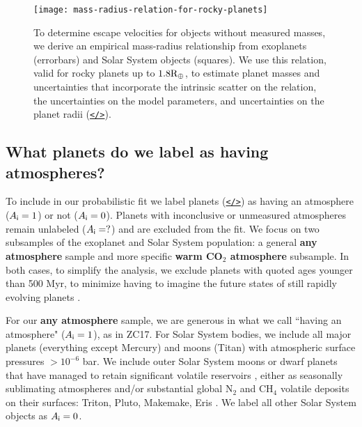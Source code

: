 \documentclass[modern,linenumbers,trackchanges]{aastex7}
\begin{document}
\begin{figure*}[ht!]
\texttt{[image: mass-radius-relation-for-rocky-planets]}
\caption{To determine escape velocities for objects without measured masses, we derive an empirical mass-radius relationship from exoplanets (errorbars) and Solar System objects (squares). We use this relation, valid for rocky planets up to $1.8\rm{R}_\oplus$, to estimate planet masses and uncertainties that incorporate the intrinsic scatter on the relation, the uncertainties on the model parameters, and uncertainties on the planet radii (\href{https://github.com/zkbt/shoreline/blob/main/notebooks/fit-mass-radius-relation.ipynb}{\texttt{</>}}).
}
\label{f:mass-radius}
\end{figure*}

\subsection{What planets do we label as having atmospheres?}

To include in our probabilistic fit we label planets (\href{https://github.com/zkbt/shoreline/blob/main/notebooks/curate-and-label-planets.ipynb}{\texttt{</>}}) as having an atmosphere ($A_{\sf i} = 1$) or not ($A_{\sf i} = 0$). Planets with inconclusive or unmeasured atmospheres remain unlabeled ($A_{\sf i} = ?$) and are excluded from the fit. We focus on two subsamples of the exoplanet and Solar System population: a general \textbf{any atmosphere} sample and more specific \textbf{warm CO$_{2}$ atmosphere} subsample. In both cases, to simplify the analysis, we exclude planets with quoted ages younger than 500 Myr, to minimize having to imagine the future states of still rapidly evolving planets \citep{lopezUnderstandingMassRadiusRelation2014a, chenEvolutionaryAnalysisGaseous2016b,  thaoFeatherweightGiantUnraveling2024b}. 

For our {\bf any atmosphere} sample, we are generous in what we call ``having an atmosphere" ($A_{\sf i} = 1$), as in ZC17. For Solar System bodies, we include all major planets (everything except Mercury) and moons (Titan) with atmospheric surface pressures $>10^{-6}$ bar. We include outer Solar System moons or dwarf planets that have managed to retain significant volatile reservoirs \citep{schallerVolatileLossRetention2007}, either as seasonally sublimating atmospheres and/or substantial global N$_2$ and CH$_4$ volatile deposits on their surfaces: Triton, Pluto, Makemake, Eris \citep{youngStructureCompositionPlutos2018, sicardyConstraintsEvolutionTriton2024, grundyModerateRatiosMethane2024}. We label all other Solar System objects as $A_{\sf i} = 0$.
\end{document}
